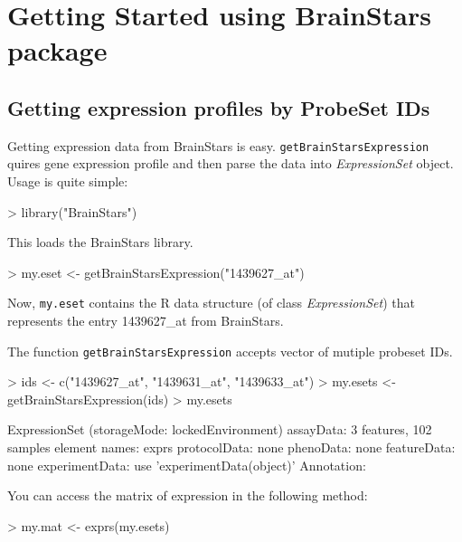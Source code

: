 \documentclass[12pt,fullpage]{article}
\newcommand{\Rfunction}[1]{{\texttt{#1}}}
\newcommand{\Robject}[1]{{\texttt{#1}}}
\newcommand{\Rclass}[1]{{\textit{#1}}}
\begin{document}
\section{Getting Started using BrainStars package}
\subsection{Getting expression profiles by ProbeSet IDs}
Getting expression data from BrainStars is easy.  \Rfunction{getBrainStarsExpression} 
quires gene expression profile and then parse the data into \Rclass{ExpressionSet} 
object.  Usage is quite simple:

\begin{Schunk}
\begin{Sinput}
> library("BrainStars")
\end{Sinput}
\end{Schunk}

This loads the BrainStars library.

\begin{Schunk}
\begin{Sinput}
> my.eset <- getBrainStarsExpression("1439627_at")
\end{Sinput}
\end{Schunk}

Now, \Robject{my.eset} contains the R data structure (of class \Rclass{ExpressionSet}) that represents the entry 1439627\_at from BrainStars.

The function \Rfunction{getBrainStarsExpression} accepts vector of mutiple probeset IDs.
\begin{Schunk}
\begin{Sinput}
> ids <- c("1439627_at", "1439631_at", "1439633_at")
> my.esets <- getBrainStarsExpression(ids)
> my.esets
\end{Sinput}
\begin{Soutput}
ExpressionSet (storageMode: lockedEnvironment)
assayData: 3 features, 102 samples 
  element names: exprs 
protocolData: none
phenoData: none
featureData: none
experimentData: use 'experimentData(object)'
Annotation:  
\end{Soutput}
\end{Schunk}

You can access the matrix of expression in the following method:
\begin{Schunk}
\begin{Sinput}
> my.mat <- exprs(my.esets)
\end{Sinput}
\end{Schunk}
\end{document}
